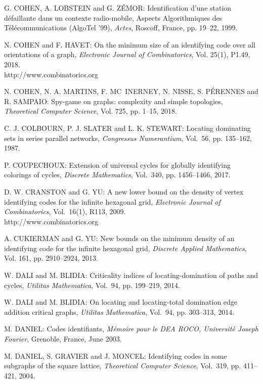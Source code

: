 \begin{thebibliography}{999}
G. COHEN, A. LOBSTEIN and G. Z\'EMOR: Identification d'une station d\'efaillante dans un contexte radio-mobile, Aspects Algorithmiques des T\'el\'ecommunications (AlgoTel '99), {\it Actes}, Roscoff, France, pp. 19--22, 1999.

N. COHEN and F. HAVET: On the minimum size of an identifying code over all orientations of a graph, {\it Electronic Journal of Combinatorics}, Vol. 25(1), P1.49, 2018.\\
http://www.combinatorics.org

N. COHEN, N. A. MARTINS, F. MC~INERNEY, N. NISSE, S. P\'E\-RENNES and R. SAMPAIO: Spy-game on graphs: complexity and simple topologies, {\it Theoretical Computer Science}, Vol. 725, pp. 1--15, 2018.

C. J. COLBOURN, P. J. SLATER and L. K. STEWART: Locating dominating sets in series parallel networks, {\it Congressus Numerantium}, Vol.~56, pp. 135--162, 1987.

P. COUPECHOUX: Extension of universal cycles for globally identifying colorings of cycles, {\it Discrete Mathematics}, Vol.~340, pp. 1456--1466, 2017.

D. W. CRANSTON and G. YU: A new lower bound on the density of vertex identifying codes for the infinite hexagonal grid, {\it Electronic Journal of Combinatorics}, Vol.~16(1), R113, 2009.\\
http://www.combinatorics.org

A. CUKIERMAN and G. YU: New bounds on the minimum density of an identifying code for the infinite hexagonal grid, {\it Discrete Applied Mathematics}, Vol. 161, pp. 2910--2924, 2013.

W. DALI and M. BLIDIA: Criticality indices of locating-domination of paths and cycles, {\it Utilitas Mathematica}, Vol.~94, pp. 199--219, 2014.

W. DALI and M. BLIDIA: On locating and locating-total domination edge addition critical graphs, {\it Utilitas Mathematica}, Vol.~94, pp. 303--313, 2014.

M. DANIEL: Codes identifiants, {\it M\'emoire pour le DEA ROCO, Universit\'e Joseph Fourier}, Grenoble, France, June 2003.

M. DANIEL, S. GRAVIER and J. MONCEL: Identifying codes in some subgraphs of the square lattice, {\it Theoretical Computer Science}, Vol.~319, pp. 411--421, 2004.


\end{thebibliography}
